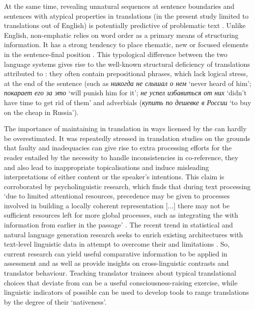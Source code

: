 \documentclass[output=paper]{langsci/langscibook.cls}
\begin{document}
At the same time, revealing unnatural sequences at sentence boundaries and sentences with atypical properties in  translations (in the present study limited to translations out of English) is potentially predictive of problematic text . Unlike English, non-emphatic  relies on word order as a primary means of structuring information. It has a strong tendency to place rhematic, new or focused elements in the sentence-final position \citep{grenoble1998deixis}. This typological difference between the two language systems gives rise to the well-known structural deficiency of  translations attributed to : they often contain prepositional phrases, which lack logical stress, at the end of the sentence (such as \textit{никогда не слышал о нем} `never heard of him'; \textit{покарает его за это} `will punish him for it'; \textit{не успел избавиться от них} `didn't have time to get rid of them' and adverbials (\textit{купить по дешевке в России} `to buy on the cheap in Russia'). 

The importance of maintaining  in translation in ways licensed by the  can hardly be overestimated. It was repeatedly stressed in translation studies \citep{blum1986shifts,hatim2005translator,baker2011other} on the grounds that faulty  and  inadequacies can give rise to extra processing efforts for the reader entailed by the necessity to handle inconsistencies in co-reference, they and also lead to inappropriate topicalisations and induce misleading interpretations of either content or the speaker's intentions. This claim is corroborated by psycholinguistic research, which finds that during text processing `due to limited attentional resources, precedence may be given to processes involved in building a locally coherent representation [...] there may not be sufficient resources left for more global processes, such as integrating the  with information from earlier in the passage' \citep[728]{guzman2000maintaining}. The recent trend in statistical  and natural language generation research seeks to enrich existing architectures with text-level linguistic data in attempt to overcome their  and  limitations \citep{meyer2012using}. So, current research can yield useful comparative information to be applied in  assessment and  as well as provide insights on cross-linguistic contrasts and translator behaviour. Teaching translator trainees about typical translational choices that deviate from  can be a useful consciousness-raising exercise, while linguistic indicators of possible  can be used to develop tools to range translations by the degree of their `nativeness'.  
\end{document}
